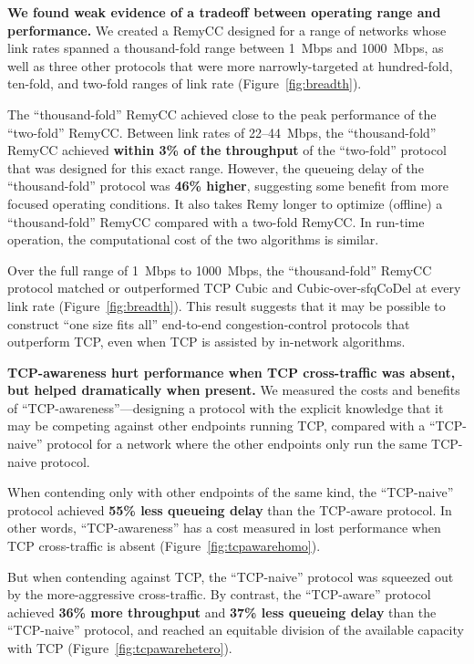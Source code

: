 \noindent 
\textbf{We found weak evidence of a tradeoff between
  operating range and performance.} We created a RemyCC designed
for a range of networks whose link rates spanned a thousand-fold range
between 1~Mbps and 1000~Mbps, as well as three other protocols that
were more narrowly-targeted at hundred-fold, ten-fold, and two-fold
ranges of link rate (Figure~\ref{fig:breadth}).

The ``thousand-fold'' RemyCC achieved close to the peak performance of
the ``two-fold'' RemyCC. Between link rates of 22--44~Mbps, the
``thousand-fold'' RemyCC achieved \textbf{within 3\% of the throughput}
of the ``two-fold'' protocol that was designed for this exact
range. However, the queueing delay of the ``thousand-fold'' protocol
was \textbf{46\% higher}, suggesting some benefit from more focused
operating conditions. It also takes Remy longer to optimize (offline)
a ``thousand-fold'' RemyCC compared with a two-fold RemyCC. In run-time
operation, the computational cost of the two algorithms is
similar.

Over the full range of 1~Mbps to 1000~Mbps, the ``thousand-fold''
RemyCC protocol matched or outperformed TCP Cubic and
Cubic-over-sfqCoDel at every link rate
(Figure~\ref{fig:breadth}). This result suggests that it may be
possible to construct ``one size fits all'' end-to-end
congestion-control protocols that outperform TCP, even when TCP is
assisted by in-network algorithms.

\vspace{\baselineskip}

\noindent \textbf{TCP-awareness hurt performance when TCP
  cross-traffic was absent, but helped dramatically when present.} We
measured the costs and benefits of ``TCP-awareness''---designing a
protocol with the explicit knowledge that it may be competing against
other endpoints running TCP, compared with a ``TCP-naive'' protocol
for a network where the other endpoints only run the same TCP-naive
protocol.

When contending only with other endpoints of the same kind, the
``TCP-naive'' protocol achieved \textbf{55\% less queueing delay} than
the TCP-aware protocol. In other words, ``TCP-awareness'' has a cost
measured in lost performance when TCP cross-traffic is absent
(Figure~\ref{fig:tcpawarehomo}).

But when contending against TCP, the ``TCP-naive'' protocol was
squeezed out by the more-aggressive cross-traffic. By contrast, the
``TCP-aware'' protocol achieved \textbf{36\% more throughput} and
\textbf{37\% less queueing delay} than the ``TCP-naive'' protocol,
and reached an equitable division of the available capacity with TCP
(Figure~\ref{fig:tcpawarehetero}).
